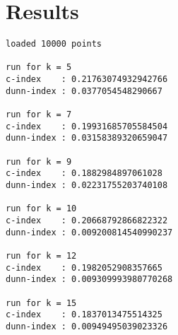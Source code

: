 \documentclass[a4paper,11pt]{report}
\begin{document}
\section*{Results}
\begin{verbatim}
loaded 10000 points

run for k = 5
c-index    : 0.21763074932942766
dunn-index : 0.0377054548290667

run for k = 7
c-index    : 0.19931685705584504
dunn-index : 0.03158389320659047

run for k = 9
c-index    : 0.1882984897061028
dunn-index : 0.02231755203740108

run for k = 10
c-index    : 0.20668792866822322
dunn-index : 0.009200814540990237

run for k = 12
c-index    : 0.1982052908357665
dunn-index : 0.009309993980770268

run for k = 15
c-index    : 0.1837013475514325
dunn-index : 0.00949495039023326
\end{verbatim}
\end{document}
